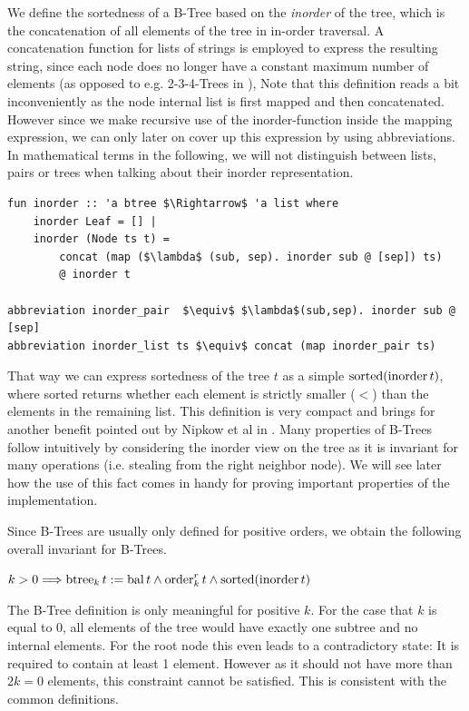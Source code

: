 We define the sortedness of a B-Tree based on the \textit{inorder} of the tree,
which is the concatenation of all elements of the tree in in-order traversal.
A concatenation function for lists of strings
is employed to express the resulting string,
since each node does no longer have a constant maximum number of elements (as opposed to
e.g. 2-3-4-Trees in \parencite{DBLP:conf/itp/Nipkow16}),
Note that this definition reads a bit inconveniently
as the node internal list is first mapped and then concatenated.
However since we make recursive use of the inorder-function
inside the mapping expression, we can only later on cover up this expression
by using abbreviations.
In mathematical terms in the following, we will not distinguish between lists, 
pairs or trees when talking about their inorder representation.

\begin{lstlisting}[mathescape=true, language=Isabelle]
fun inorder :: 'a btree $\Rightarrow$ 'a list where
    inorder Leaf = [] |
    inorder (Node ts t) = 
        concat (map ($\lambda$ (sub, sep). inorder sub @ [sep]) ts)
        @ inorder t

abbreviation inorder_pair  $\equiv$ $\lambda$(sub,sep). inorder sub @ [sep]
abbreviation inorder_list ts $\equiv$ concat (map inorder_pair ts)
\end{lstlisting}

That way we can express sortedness of the tree $t$ as a simple $\operatorname{sorted} (\operatorname{inorder} t)$,
where sorted returns whether each element is strictly smaller ($<$) than the elements in the remaining list.
This definition is very compact and brings for another benefit pointed out by Nipkow et al in \parencite{DBLP:conf/itp/Nipkow16}.
Many properties of B-Trees follow intuitively by considering
the inorder view on the tree as it is invariant for many operations (i.e. stealing from the right neighbor node).
We will see later how the use of this fact comes in handy for proving
important properties of the implementation.

Since B-Trees are usually only defined for positive
orders, we obtain the following overall invariant for B-Trees.
\begin{definition}
    $k > 0 \Longrightarrow \operatorname{btree}_k t := \operatorname{bal} t \wedge \operatorname{order}^r_k t \wedge \operatorname{sorted} (\operatorname{inorder} t)$
\end{definition}

The B-Tree definition is only meaningful for positive $k$.
For the case that $k$ is equal to 0,
all elements of the tree would have exactly one subtree
and no internal elements.
For the root node this even leads to a contradictory state:
It is required to contain at least 1 element.
However as it should not have more than $2k=0$ elements,
this constraint cannot be satisfied.
This is consistent with the common definitions.

